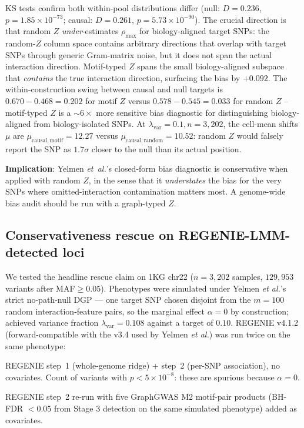 KS tests confirm both within-pool distributions differ (null:
$D=0.236$, $p=1.85\times10^{-73}$; causal: $D=0.261$,
$p=5.73\times10^{-90}$). The crucial direction is that random $Z$
\emph{under}-estimates $\rho_{\max}$ for biology-aligned target SNPs:
the random-$Z$ column space contains arbitrary directions that overlap
with target SNPs through generic Gram-matrix noise, but it does not span
the actual interaction direction. Motif-typed $Z$ spans the small
biology-aligned subspace that \emph{contains} the true interaction
direction, surfacing the bias by $+0.092$. The within-construction swing
between causal and null targets is $0.670-0.468=0.202$ for motif $Z$
versus $0.578-0.545=0.033$ for random $Z$ -- motif-typed $Z$ is a
$\sim$$6\times$ more sensitive bias diagnostic for distinguishing
biology-aligned from biology-isolated SNPs. At
$\lambda_{\mathrm{var}}=0.1, n=3{,}202$, the cell-mean shifts $\mu$
are $\mu_{\mathrm{causal,motif}}=12.27$ versus
$\mu_{\mathrm{causal,random}}=10.52$: random $Z$ would falsely report
the SNP as $1.7\sigma$ closer to the null than its actual position.

\textbf{Implication}: Yelmen \emph{et~al.}'s closed-form bias diagnostic
is conservative when applied with random $Z$, in the sense that it
\emph{understates} the bias for the very SNPs where omitted-interaction
contamination matters most. A genome-wide bias audit should be run with
a graph-typed $Z$.

\subsection{Conservativeness rescue on REGENIE-LMM-detected loci}\label{sec:rescue}

We tested the headline rescue claim on 1KG chr22 ($n=3{,}202$ samples,
$129{,}953$ variants after MAF$\geq 0.05$). Phenotypes were simulated
under Yelmen \emph{et al.}'s strict no-path-null DGP — one target SNP
chosen disjoint from the $m=100$ random interaction-feature pairs, so
the marginal effect $\alpha=0$ by construction; achieved variance
fraction $\lambda_{\mathrm{var}}=0.108$ against a target of $0.10$.
REGENIE v4.1.2 (forward-compatible with the v3.4 used by Yelmen
\emph{et al.}) was run twice on the same phenotype:

\begin{description}
\setlength{\itemsep}{0pt}
\item[Baseline]  REGENIE step~1 (whole-genome ridge) + step~2 (per-SNP
  association), no covariates. Count of variants with $p<5\times 10^{-8}$:
  these are spurious because $\alpha=0$.
\item[Rescue]    REGENIE step~2 re-run with five GraphGWAS M2 motif-pair
  products (BH-FDR $<0.05$ from Stage 3 detection on the same simulated
  phenotype) added as covariates.
\end{description}


